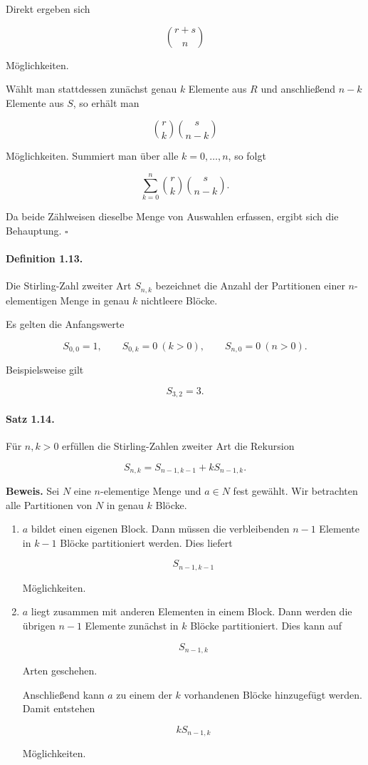 \documentclass{article}
\begin{document}
Direkt ergeben sich

\[
\binom{r+s}{n}
\]

Möglichkeiten.

Wählt man stattdessen zunächst genau \(k\) Elemente aus \(R\)
und anschließend \(n-k\) Elemente aus \(S\), so erhält man

\[
\binom{r}{k}\binom{s}{n-k}
\]

Möglichkeiten.
Summiert man über alle \(k=0,\dots,n\), so folgt

\[
\sum_{k=0}^{n}
\binom{r}{k}
\binom{s}{n-k}.
\]

Da beide Zählweisen dieselbe Menge von Auswahlen erfassen,
ergibt sich die Behauptung.
\hfill $\square$

\paragraph{Definition 1.13.}
Die Stirling-Zahl zweiter Art \(S_{n,k}\) bezeichnet die Anzahl der
Partitionen einer \(n\)-elementigen Menge in genau \(k\) nichtleere
Blöcke.

Es gelten die Anfangswerte

\[
S_{0,0}=1,
\qquad
S_{0,k}=0 \ (k>0),
\qquad
S_{n,0}=0 \ (n>0).
\]

Beispielsweise gilt

\[
S_{3,2}=3.
\]

\paragraph{Satz 1.14.}
Für \(n,k>0\) erfüllen die Stirling-Zahlen zweiter Art die Rekursion

\[
S_{n,k}
=
S_{n-1,k-1}
+
kS_{n-1,k}.
\]

\textbf{Beweis.}
Sei \(N\) eine \(n\)-elementige Menge und \(a\in N\) fest gewählt.
Wir betrachten alle Partitionen von \(N\) in genau \(k\) Blöcke.

\begin{enumerate}
\item
\(a\) bildet einen eigenen Block.
Dann müssen die verbleibenden \(n-1\) Elemente in
\(k-1\) Blöcke partitioniert werden.
Dies liefert

\[
S_{n-1,k-1}
\]

Möglichkeiten.

\item
\(a\) liegt zusammen mit anderen Elementen in einem Block.
Dann werden die übrigen \(n-1\) Elemente zunächst in
\(k\) Blöcke partitioniert.
Dies kann auf

\[
S_{n-1,k}
\]

Arten geschehen.

Anschließend kann \(a\) zu einem der \(k\) vorhandenen
Blöcke hinzugefügt werden.
Damit entstehen

\[
kS_{n-1,k}
\]

Möglichkeiten.
\end{enumerate}
\end{document}
